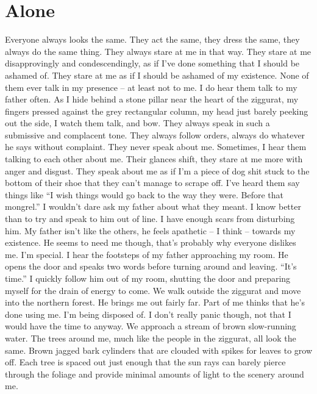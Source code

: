 \documentclass[openany, 12pt]{book}
\newcommand\tab[1][1cm]{\hspace*{#1}}
\begin{document}
\chapter{Alone}
\tab
Everyone always looks the same. They act the same, they dress the same, they always do the same thing. They always stare at me in that way. They stare at me disapprovingly and condescendingly, as if I’ve done something that I should be ashamed of. They stare at me as if I should be ashamed of my existence.\newline
\tab
None of them ever talk in my presence -- at least not to me. I do hear them talk to my father often. As I hide behind a stone pillar near the heart of the ziggurat, my fingers pressed against the grey rectangular column, my head just barely peeking out the side, I watch them talk, and bow. They always speak in such a submissive and complacent tone. They always follow orders, always do whatever he says without complaint. They never speak about me.
\newline
\tab
Sometimes, I hear them talking to each other about me. Their glances shift, they stare at me more with anger and disgust. They speak about me as if I’m a piece of dog shit stuck to the bottom of their shoe that they can’t manage to scrape off. I’ve heard them say things like ``I wish things would go back to the way they were. Before that mongrel.''\newline
\tab
I wouldn’t dare ask my father about what they meant. I know better than to try and speak to him out of line. I have enough scars from disturbing him. My father isn’t like the others, he feels apathetic -- I think -- towards my existence. He seems to need me though, that’s probably why everyone dislikes me. I’m special. 
\newline
\tab
I hear the footsteps of my father approaching my room. He opens the door and speaks two words before turning around and leaving. ``It’s time.'' 
\newline
\tab
I quickly follow him out of my room, shutting the door and preparing myself for the drain of energy to come. We walk outside the ziggurat and move into the northern forest. He brings me out fairly far. Part of me thinks that he’s done using me. I’m being disposed of. I don’t really panic though, not that I would have the time to anyway. We approach a stream of brown slow-running water. The trees around me, much like the people in the ziggurat, all look the same. Brown jagged bark cylinders that are clouded with spikes for leaves to grow off. Each tree is spaced out just enough that the sun rays can barely pierce through the foliage and provide minimal amounts of light to the scenery around me. 
\end{document}
